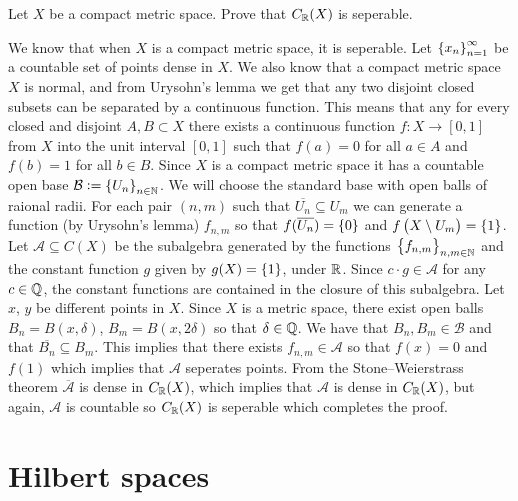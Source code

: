 \documentclass[11pt,a4paper]{article}
\begin{document}
\begin{exercise}
  Let $X$ be a compact metric space.
  Prove that $C_{\mathbb{R}}(X)$ is seperable.
\end{exercise}
\begin{solution}
  We know that when $X$ is a compact metric space, it is seperable.
  Let $\left\{x_n\right\}_{n=1}^{\infty}$ be a countable set of points dense in $X$.
  We also know that a compact metric space $X$ is normal,
  and from Urysohn's lemma we get that any two disjoint closed subsets can be
  separated by a continuous function.
  This means that any for every closed and disjoint $A,B \subset X$
  there exists a continuous function $f \colon X \to [0,1]$
  from $X$ into the unit interval $[0,1]$ such that $f(a) = 0$
  for all $a \in A$ and $f(b) = 1$ for all $b \in B$.
  Since $X$ is a compact metric space it has a countable open base
  $\mathcal B := \left\{U_n\right\}_{n \in \mathbb{N}}$.
  We will choose the standard base with open balls of raional radii.
  For each pair $(n,m)$ such that $\overline{U_n} \subseteq U_m$
  we can generate a function (by Urysohn's lemma) $f_{n,m}$
  so that $f(\overline{U_n}) = \left\{0\right\}$ and
  $f\del{X \setminus U_m} = \set{1}$.
  Let $\mathcal A \subseteq C(X)$ be the subalgebra generated
  by the functions $\left\{f_{n,m}\right\}_{n,m \in \mathbb{N}}$ and the constant
  function $g$ given by $g(X) = \left\{1\right\}$, under $\mathbb{R}$.
  Since $c \cdot g \in \mathcal A$ for any $c \in \mathbb{Q}$, the constant functions
  are contained in the closure of this subalgebra.
  Let $x$, $y$ be different points in $X$.
  Since $X$ is a metric space, there exist open balls
  $B_n = B(x,\delta)$, $B_m = B(x,2\delta)$ so that $\delta \in \mathbb{Q}$.
  We have that $B_n,B_m \in \mathcal B$ and that $\overline{B_n} \subseteq B_m$.
  This implies that there exists $f_{n,m} \in \mathcal A$ so that
  $f(x) = 0$ and $f(1)$ which implies that $\mathcal A$ seperates points.
  From the Stone--Weierstrass theorem $\overline{\mathcal A}$
  is dense in $C_{\mathbb{R}}(X)$,
  which implies that $\mathcal A$ is dense in $C_{\mathbb{R}}(X)$,
  but again, $\mathcal A$ is countable so $C_{\mathbb{R}}(X)$ is seperable which
  completes the proof.
\end{solution}

\newpage

\section{Hilbert spaces}
\end{document}
